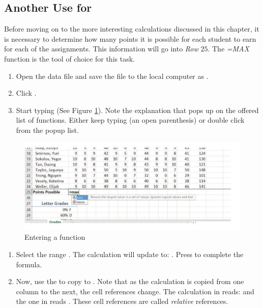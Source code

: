 \subsection{Another Use for }

Before moving on to the more interesting calculations discussed in this chapter, it is necessary to determine how many points it is possible for each student to earn for each of the assignments. This information will go into \textit{Row} $ 25 $. The \textit{=MAX} function is the tool of choice for this task.

\begin{enumerate}
	\item Open the data file  and save the file to the local computer as .
	\item Click .
	\item Start typing  (See Figure \ref{03:fig02}). Note the explanation that pops up on the offered list of functions. Either keep typing \fmtTyping{(} (an open parenthesis) or double click  from the popup list.
\end{enumerate}

\begin{figure}[H]
	\centering
	\includegraphics[width=\maxwidth{.95\linewidth}]{gfx/ch03_fig02}
	\caption{Entering a function}
	\label{03:fig02}
\end{figure}

\begin{enumerate}[resume]
	\item Select the range . The calculation will update to: . Press  to complete the formula.
	\item Now, use the  to copy  to . Note that as the calculation is copied from one column to the next, the cell references change. The calculation in  reads:  and the one in  reads . These cell references are called \textit{relative} references.
\end{enumerate}

